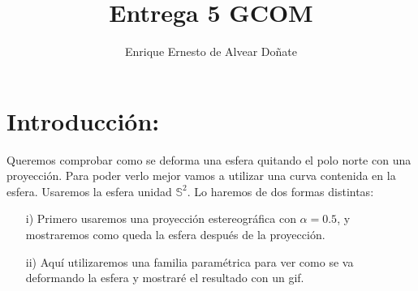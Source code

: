 \documentclass[11pt,a4paper,openright]{article}
\title{Entrega 5 GCOM}
\author{Enrique Ernesto de Alvear Doñate}
\begin{document}
\maketitle
\section{Introducción:}
Queremos comprobar como se deforma una esfera quitando el polo norte con una proyección. Para poder verlo mejor vamos a utilizar una curva contenida en la esfera. Usaremos la esfera unidad $\mathbb{S}^2$. Lo haremos de dos formas distintas:
\begin{enumerate}
\item[i)] Primero usaremos una proyección estereográfica con $\alpha=0.5$, y mostraremos como queda la esfera después de la proyección.
\item[ii)]Aquí utilizaremos una familia paramétrica para ver como se va deformando la esfera y mostraré el resultado con un gif.
\end{enumerate}
\end{document}
